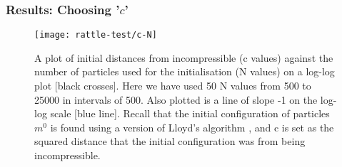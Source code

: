 \documentclass[10pt]{beamer}
\begin{document}
\frame
{
  \frametitle{Results: Choosing '\(c\)'}

\begin{figure}[H]
\texttt{[image: rattle-test/c-N]}
\centering
\caption{A plot of initial distances from incompressible (c values) against the number of particles used for the initialisation (N values) on a log-log plot [black crosses]. Here we have used 50 N values from 500 to 25000 in intervals of 500. Also plotted is a line of slope -1 on the log-log scale [blue line]. Recall that the initial configuration of particles \(m^0\) is found using a version of Lloyd's algorithm \citep{merigot2017algorithm}, and c is set as the squared distance that the initial configuration was from being incompressible. }
\centering
\label{fig:c-N}
\end{figure}

}
\end{document}
